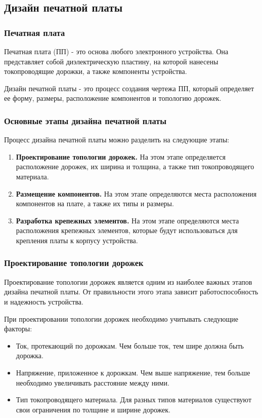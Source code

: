 \subsection{Дизайн печатной платы}

\subsubsection{Печатная плата}

Печатная плата (ПП) - это основа любого электронного устройства. Она представляет собой диэлектрическую пластину, на которой нанесены токопроводящие дорожки, а также компоненты устройства.

Дизайн печатной платы - это процесс создания чертежа ПП, который определяет ее форму, размеры, расположение компонентов и топологию дорожек.

\subsubsection{Основные этапы дизайна печатной платы}
Процесс дизайна печатной платы можно разделить на следующие этапы:
\begin{enumerate}
    \item \textbf{Проектирование топологии дорожек.} На этом этапе определяется расположение дорожек, их ширина и толщина, а также тип токопроводящего материала.
    \item \textbf{Размещение компонентов.} На этом этапе определяются места расположения компонентов на плате, а также их типы и размеры.
    \item \textbf{Разработка крепежных элементов.} На этом этапе определяются места расположения крепежных элементов, которые будут использоваться для крепления платы к корпусу устройства.
\end{enumerate}

\subsubsection{Проектирование топологии дорожек}
Проектирование топологии дорожек является одним из наиболее важных этапов дизайна печатной платы. От правильности этого этапа зависит работоспособность и надежность устройства.

При проектировании топологии дорожек необходимо учитывать следующие факторы:
\begin{itemize}
    \item Ток, протекающий по дорожкам. Чем больше ток, тем шире должна быть дорожка.
    \item Напряжение, приложенное к дорожкам. Чем выше напряжение, тем больше необходимо увеличивать расстояние между ними.
    \item Тип токопроводящего материала. Для разных типов материалов существуют свои ограничения по толщине и ширине дорожек.
\end{itemize}
    
